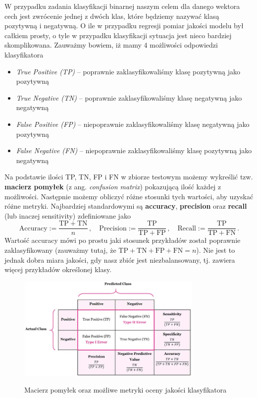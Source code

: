 \documentclass{myclass}
\numberwithin{equation}{subsection}
\begin{document}
W przypadku zadania klasyfikacji binarnej naszym celem dla danego wektora cech jest zwrócenie jednej
z dwóch klas, które będziemy nazywać klasą pozytywną i negatywną. O ile w przypadku regresji pomiar
jakości modelu był całkiem prosty, o tyle w przypadku klasyfikacji sytuacja jest nieco bardziej
skomplikowana. Zauważmy bowiem, iż mamy 4 możliwości odpowiedzi klasyfikatora
\begin{itemize}

    \item \textit{True Positive (TP)} -- poprawnie zaklasyfikowaliśmy klasę pozytywną jako pozytywną
    
    \item \textit{True Negative (TN)} -- poprawnie zaklasyfikowaliśmy klasę negatywną jako negatywną

    \item \textit{False Positive (FP)} -- niepoprawnie zaklasyfikowaliśmy klasę negatywną jako
    pozytywną

    \item \textit{False Negative (FN)} -- niepoprawnie zaklasyfikowaliśmy klasę pozytywną jako
    negatywną
    
\end{itemize}

Na podstawie ilości TP, TN, FP i FN w zbiorze testowym możemy wykreślić tzw. \textbf{macierz
pomyłek} (z ang. \textit{confusion matrix}) pokazującą ilość każdej z możliwości. Następnie możemy
obliczyć różne stosunki tych wartości, aby uzyskać różne metryki. Najbardziej standardowymi są
\textbf{accuracy}, \textbf{precision} oraz \textbf{recall} (lub inaczej sensitivity) zdefiniowane
jako
\begin{equation}
    \mathrm{Accuracy} := \frac{\mathrm{TP} + \mathrm{TN}}{n}\,,\quad\mathrm{Precision} := \frac{\mathrm{TP}}{\mathrm{TP} + \mathrm{FP}}\,,\quad\mathrm{Recall} := \frac{\mathrm{TP}}{\mathrm{TP} + \mathrm{FN}}\,.
\end{equation}
Wartość accuracy mówi po prostu jaki stosunek przykładów został poprawnie zaklasyfikowany (zauważmy
tutaj, że \(\mathrm{TP + TN + FP + FN} = n\)). Nie jest to jednak dobra miara jakości, gdy nasz
zbiór jest niezbalansowany, tj. zawiera więcej przykładów określonej klasy.

\begin{figure}[ht]
    \centering
    \includegraphics[width=0.8\textwidth]{figs/confusionMatrix.jpg}
    \label{fig:confusionMatrix}
    \caption{Macierz pomyłek oraz możliwe metryki oceny jakości klasyfikatora}
\end{figure}
\end{document}
